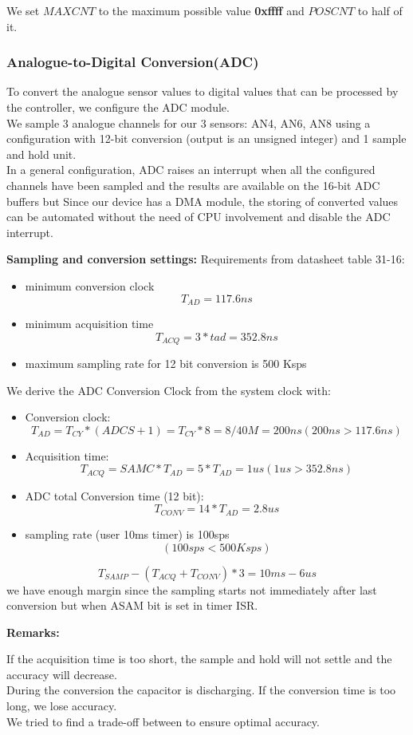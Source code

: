 We set $MAXCNT$ to the maximum possible value \textbf{0xffff} and $POSCNT$ to half of it.


\subsubsection*{Analogue-to-Digital Conversion(ADC)}

To convert the analogue sensor values to digital values that can be processed by the controller, we configure the ADC module. \\
We sample 3 analogue channels for our 3 sensors: AN4, AN6, AN8 using a configuration with 12-bit conversion (output is an unsigned integer) and 1 sample and hold unit.\\
In a general configuration, ADC raises an interrupt when all the configured channels have been sampled and the results are available on the 16-bit ADC buffers but Since our device has a DMA module, the storing of converted values can be automated without the need of CPU involvement and disable the ADC interrupt.

\textbf{Sampling and conversion settings:}
Requirements from datasheet table 31-16: 
\begin{itemize}
    \item minimum conversion clock $$T_{AD} = 117.6 ns$$
    \item minimum acquisition time $$T_{ACQ}=3*tad= 352.8ns $$
    \item maximum sampling rate for 12 bit conversion is 500 Ksps
\end{itemize}

We derive the ADC Conversion Clock from the system clock with:
\begin{itemize}
    \item Conversion clock: $$T_{AD}=T_{CY}*(ADCS+1)= T_{CY}*8 = 8/40M= 200ns (200ns>117.6ns)$$
    \item Acquisition time:$$ T_{ACQ}= SAMC*T_{AD}= 5*T_{AD}=1us (1us>352.8ns)$$
    \item ADC total Conversion time (12 bit): $$T_{CONV}=14*T_{AD}=2.8us$$
    \item sampling rate (user 10ms timer) is 100sps $$(100sps < 500Ksps)$$
\end{itemize}
$$T_{SAMP}-(T_{ACQ}+T_{CONV})*3=10ms-6us$$ 
we have enough margin since the sampling starts not immediately after last conversion but when ASAM bit is set in timer ISR.

\textbf{Remarks:}

If the acquisition time is too short, the sample and hold will not settle and the accuracy will decrease.\\
During the conversion the capacitor is discharging. If the conversion time is too long, we lose accuracy. \\
We tried to find a trade-off between to ensure optimal accuracy.

